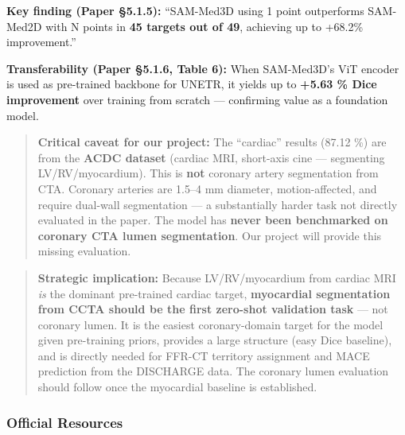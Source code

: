 \documentclass[
  11pt,
]{article}
\begin{document}
\textbf{Key finding (Paper §5.1.5):} ``SAM-Med3D using 1 point
outperforms SAM-Med2D with N points in \textbf{45 targets out of 49},
achieving up to +68.2\% improvement.''

\textbf{Transferability (Paper §5.1.6, Table 6):} When SAM-Med3D's ViT
encoder is used as pre-trained backbone for UNETR, it yields up to
\textbf{+5.63 \% Dice improvement} over training from scratch ---
confirming value as a foundation model.

\begin{quote}
\textbf{Critical caveat for our project:} The ``cardiac'' results (87.12
\%) are from the \textbf{ACDC dataset} (cardiac MRI, short-axis cine ---
segmenting LV/RV/myocardium). This is \textbf{not} coronary artery
segmentation from CTA. Coronary arteries are 1.5--4 mm diameter,
motion-affected, and require dual-wall segmentation --- a substantially
harder task not directly evaluated in the paper. The model has
\textbf{never been benchmarked on coronary CTA lumen segmentation}. Our
project will provide this missing evaluation.
\end{quote}

\begin{quote}
\textbf{Strategic implication:} Because LV/RV/myocardium from cardiac
MRI \emph{is} the dominant pre-trained cardiac target,
\textbf{myocardial segmentation from CCTA should be the first zero-shot
validation task} --- not coronary lumen. It is the easiest
coronary-domain target for the model given pre-training priors, provides
a large structure (easy Dice baseline), and is directly needed for
FFR-CT territory assignment and MACE prediction from the DISCHARGE data.
The coronary lumen evaluation should follow once the myocardial baseline
is established.
\end{quote}

\subsubsection{Official Resources}\label{official-resources}
\end{document}
